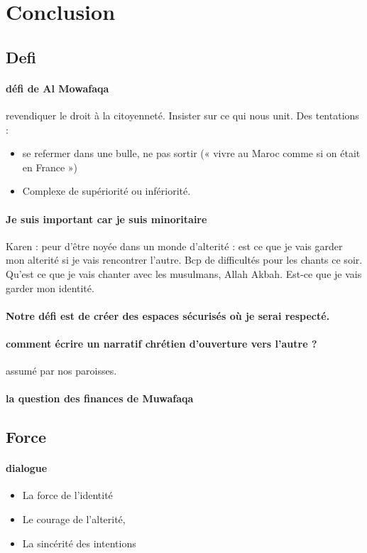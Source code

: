 \section{Conclusion}
\subsection{Defi}
\paragraph{défi de Al Mowafaqa} revendiquer le droit à la citoyenneté. Insister sur ce qui nous unit. 
Des tentations : 
\begin{itemize}
\item se refermer dans une bulle, ne pas sortir (« vivre au Maroc comme si on était en France »)
\item Complexe de supériorité ou infériorité. 
\end{itemize}

\paragraph{Je suis important car je suis minoritaire} Karen : peur d’être noyée dans un monde d’alterité : est ce que je vais garder mon alterité si je vais rencontrer l’autre.  Bcp de difficultés pour les chants ce soir. Qu’est ce que je vais chanter avec les musulmans, Allah Akbah. Est-ce que je vais garder mon identité. 
\paragraph{Notre défi est de créer des espaces sécurisés où je serai respecté.  }
\paragraph{comment écrire un narratif chrétien d’ouverture vers l’autre ? } assumé par nos paroisses. 
\paragraph{la question des finances de Muwafaqa}

\subsection{Force}
\paragraph{dialogue}
\begin{itemize}
\item La force de l’identité
\item Le courage de l’alterité, 
\item La sincérité des intentions
\end{itemize}
